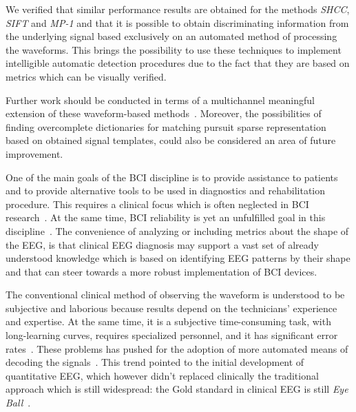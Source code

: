 \documentclass[brainsci,article,submit,moreauthors,pdftex,10pt,a4paper]{mdpi}
\begin{document}
We verified that similar performance results are obtained for the methods \textit{SHCC}, \textit{SIFT} and \textit{MP-1} and that it is possible to obtain discriminating information from the underlying signal based exclusively on an automated method of processing the waveforms.  This brings the possibility to use these techniques to implement intelligible automatic detection procedures due to the fact that they are based on metrics which can be visually verified.  

Further work should be conducted in terms of a multichannel meaningful extension of these waveform-based methods~\citep{Gribonval2008}. Moreover, the possibilities of finding overcomplete dictionaries for matching pursuit sparse representation based on obtained signal templates, could also be considered an area of future improvement.


One of the main goals of the BCI discipline is to provide assistance to patients and to provide alternative tools to be used in diagnostics and rehabilitation procedure.  This requires a clinical focus which is often neglected in BCI research~\citep{Chavarriaga2017}.  At the same time, BCI reliability is yet an unfulfilled goal in this discipline~\citep{WolpawJonathanR2012}. The convenience of analyzing or including metrics about the shape of the EEG, is that clinical EEG diagnosis may support a vast set of already understood knowledge which is based on identifying EEG patterns by their shape and that can steer towards a more robust implementation of BCI devices.

The conventional clinical method of observing the waveform is understood to be subjective and laborious because results depend on the technicians' experience and expertise.   At the same time, it is a subjective time-consuming task, with long-learning curves, requires specialized personnel, and it has significant error rates~\citep{Tjepkema-Cloostermans2018}.  These problems has pushed for the adoption of more automated means of decoding the signals~\citep{Thakor2004}.   This trend pointed to the initial development of quantitative EEG, which however didn't replaced clinically the traditional approach which is still widespread: the Gold standard in clinical EEG is still \textit{Eye Ball}~\citep{Wulsin2011,Tjepkema-Cloostermans2018}.  
\end{document}
